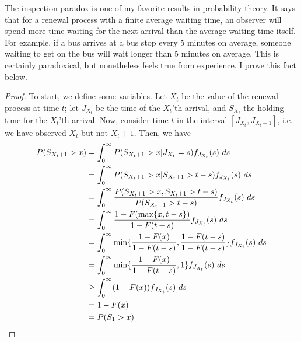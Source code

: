 \documentclass{article}
\begin{document}
The inspection paradox is one of my favorite results in probability theory. It says that for a renewal process with a finite average waiting time, 
an observer will spend more time waiting for the next arrival than the average waiting time itself. For example, if a bus arrives at a bus stop 
every 5 minutes on average, someone waiting to get on the bus will wait longer than 5 minutes on average. This is certainly paradoxical, but nonetheless 
feels true from experience. I prove this fact below. 

\begin{proof}
To start, we define some variables. Let $X_t$ be the value of the renewal process at time $t$; let $J_{X_t}$ be the time of the $X_t$'th arrival, 
and $S_{X_t}$ the holding time for the $X_t$'th arrival. Now, consider time $t$ in the interval $[J_{X_t}, J_{{X_t}+1}]$, i.e. we have observed 
$X_t$ but not $X_t + 1$. Then, we have
\begin{align*}
    P(S_{{X_t}+1} > x) &= \int_{0}^{\infty} P(S_{{X_t}+1} > x | J_{X_t} = s) f_{J_{X_t}}(s) \ ds \\
    &= \int_{0}^{\infty} P(S_{{X_t}+1} > x | S_{{X_t}+1} > t - s) f_{J_{X_t}}(s) \ ds \\
    &= \int_{0}^{\infty} \frac{P(S_{{X_t}+1} > x, S_{{X_t}+1} > t - s)}{P(S_{{X_t}+1} > t - s)} f_{J_{X_t}}(s) \ ds \\
    &= \int_{0}^{\infty} \frac{1 - F(\max\{x, t - s\})}{1 - F(t -s)} f_{J_{X_t}}(s) \ ds \\
    &= \int_{0}^{\infty} \min\{\frac{1 - F(x)}{1 - F(t - s)}, \frac{1 - F(t -s )}{1 - F(t - s)}\} f_{J_{X_t}}(s) \ ds \\
    &= \int_{0}^{\infty} \min\{\frac{1 - F(x)}{1 - F(t - s)}, 1\} f_{J_{X_t}}(s) \ ds \\
    &\geq \int_{0}^{\infty} (1 - F(x)) f_{J_{X_t}}(s) \ ds \\
    &= 1 - F(x) \\
    &= P(S_{1} > x) \qedhere
\end{align*}
\end{proof}
\end{document}
